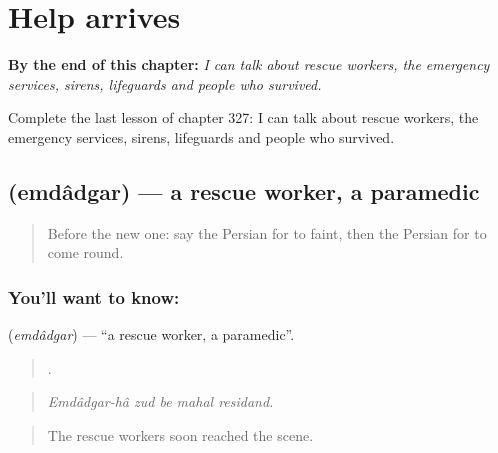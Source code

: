 
\chapter{Help arrives}
\label{ch:fa-help-arrives}

\begin{chapteropening}
\textbf{By the end of this chapter:} \emph{I can talk about rescue workers, the emergency services, sirens, lifeguards and people who survived.}

Complete the last lesson of chapter 327: I can talk about rescue workers, the emergency services, sirens, lifeguards and people who survived.
\end{chapteropening}

\section[\texorpdfstring{\fa{امدادگر} (emdâdgar)}{امدادگر (emdâdgar)}]{ (emdâdgar) — a rescue worker, a paramedic}

\label{lesson:FA-C327-emdadgar}



\begin{quote}
Before the new one: say the Persian for to faint, then the Persian for to come round.
\end{quote}

\subsection*{You'll want to know: }
\textbf{} (\emph{emdâdgar}) — \textquotedblleft{}a rescue worker, a paramedic\textquotedblright{}.

\begin{quote}
    .
\end{quote}

\begin{quote}
\emph{Emdâdgar-hâ zud be mahal residand.}
\end{quote}

\begin{quote}
The rescue workers soon reached the scene.
\end{quote}

